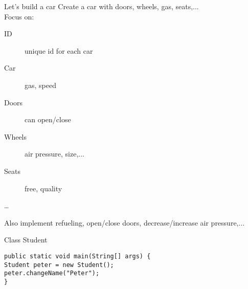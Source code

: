 \begin{frame}{Let's build a car}
Create a car with doors, wheels, gas, seats,... \\
\vspace{1em}
Focus on:
\begin{description}
	\item[ID] unique id for each car
	\item[Car] gas, speed
	\item[Doors] can open/close
	\item[Wheels] air pressure, size,...
	\item[Seats] free, quality
	\item[\dots]
\end{description}
Also implement refueling, open/close doors, decrease/increase air pressure,...
\end{frame}


\begin{frame}[fragile]{Class Student}
\begin{lstlisting}
public static void main(String[] args) {
Student peter = new Student();
peter.changeName("Peter");
}
\end{lstlisting}
\end{frame}


